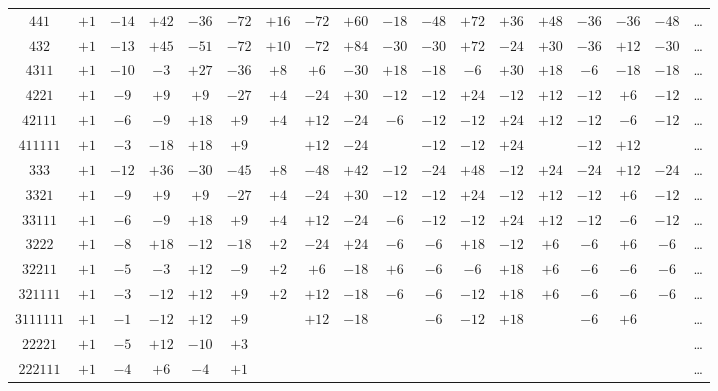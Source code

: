 \documentclass[11pt,a4paper]{book}
\begin{document}
\begin{center}
\begin{tabular}{c|c|c|c|c|c|c|c|c|c|c|c|c|c|c|c|c|c}
$441$ & $+1$ & $-14$ & $+42$ & $-36$ & $-72$ & $+16$ & $-72$ & $+60$ & $-18$ & $-48$ & $+72$ & $+36$ & $+48$ & $-36$ & $-36$ & $-48$ & \dots \\
$432$ & $+1$ & $-13$ & $+45$ & $-51$ & $-72$ & $+10$ & $-72$ & $+84$ & $-30$ & $-30$ & $+72$ & $-24$ & $+30$ & $-36$ & $+12$ & $-30$ & \dots \\
$4311$ & $+1$ & $-10$ & $-3$ & $+27$ & $-36$ & $+8$ & $+6$ & $-30$ & $+18$ & $-18$ & $-6$ & $+30$ & $+18$ & $-6$ & $-18$ & $-18$ & \dots \\
$4221$ & $+1$ & $-9$ & $+9$ & $+9$ & $-27$ & $+4$ & $-24$ & $+30$ & $-12$ & $-12$ & $+24$ & $-12$ & $+12$ & $-12$ & $+6$ & $-12$ & \dots \\
$42111$ & $+1$ & $-6$ & $-9$ & $+18$ & $+9$ & $+4$ & $+12$ & $-24$ & $-6$ & $-12$ & $-12$ & $+24$ & $+12$ & $-12$ & $-6$ & $-12$ & \dots \\
$411111$ & $+1$ & $-3$ & $-18$ & $+18$ & $+9$ & & $+12$ & $-24$ & & $-12$ & $-12$ & $+24$ & & $-12$ & $+12$ & & \dots \\
$333$ & $+1$ & $-12$ & $+36$ & $-30$ & $-45$ & $+8$ & $-48$ & $+42$ & $-12$ & $-24$ & $+48$ & $-12$ & $+24$ & $-24$ & $+12$ & $-24$ & \dots \\
$3321$ & $+1$ & $-9$ & $+9$ & $+9$ & $-27$ & $+4$ & $-24$ & $+30$ & $-12$ & $-12$ & $+24$ & $-12$ & $+12$ & $-12$ & $+6$ & $-12$ & \dots \\
$33111$ & $+1$ & $-6$ & $-9$ & $+18$ & $+9$ & $+4$ & $+12$ & $-24$ & $-6$ & $-12$ & $-12$ & $+24$ & $+12$ & $-12$ & $-6$ & $-12$ & \dots \\
$3222$ & $+1$ & $-8$ & $+18$ & $-12$ & $-18$ & $+2$ & $-24$ & $+24$ & $-6$ & $-6$ & $+18$ & $-12$ & $+6$ & $-6$ & $+6$ & $-6$ & \dots \\
$32211$ & $+1$ & $-5$ & $-3$ & $+12$ & $-9$ & $+2$ & $+6$ & $-18$ & $+6$ & $-6$ & $-6$ & $+18$ & $+6$ & $-6$ & $-6$ & $-6$ & \dots \\
$321111$ & $+1$ & $-3$ & $-12$ & $+12$ & $+9$ & $+2$ & $+12$ & $-18$ & $-6$ & $-6$ & $-12$ & $+18$ & $+6$ & $-6$ & $-6$ & $-6$ & \dots \\
$3111111$ & $+1$ & $-1$ & $-12$ & $+12$ & $+9$ & & $+12$ & $-18$ & & $-6$ & $-12$ & $+18$ & & $-6$ & $+6$ & & \dots \\
$22221$ & $+1$ & $-5$ & $+12$ & $-10$ & $+3$ & & & & & & & & & & & & \dots \\
$222111$ & $+1$ & $-4$ & $+6$ & $-4$ & $+1$ & & & & & & & & & & & & \dots
\end{tabular}
\end{center}
\end{document}
